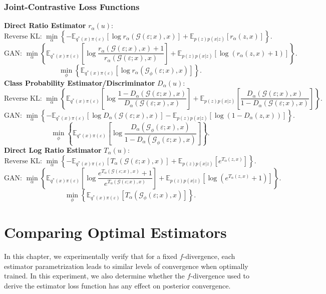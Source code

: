 \documentclass[honours,12pt, twoside]{unswthesis}
\newcommand{\E}{\mathbb{E}}
\numberwithin{equation}{section}
\theoremstyle{definition}
\begin{document}
\subsection{Joint-Contrastive Loss Functions}
\textbf{Direct Ratio Estimator} $r_\alpha(u)$:
\[\text{Reverse KL: }\min_\alpha \left\lbrace-\E_{q^*(x)\pi(\varepsilon)}[\log r_\alpha(\mathcal{G}(\varepsilon;x),x)]+\E_{p(z)p(x|z)}[r_\alpha(z,x)]\right\rbrace.\]
\[\text{GAN: }\min_\alpha \left\lbrace\E_{q^*(x)\pi(\varepsilon)}\left[\log \frac{r_\alpha(\mathcal{G}(\varepsilon;x),x)+1}{r_\alpha(\mathcal{G}(\varepsilon;x),x)}\right]+\E_{p(z)p(x|z)}[\log(r_\alpha(z,x)+1)]\right\rbrace.\]
\[\min_\phi \left\lbrace\E_{q^*(x)\pi(\varepsilon)}\left[\log r_\alpha(\mathcal{G}_\phi(\varepsilon;x),x)\right]\right\rbrace.\]
\textbf{Class Probability Estimator/Discriminator} $D_\alpha(u)$:
\[\text{Reverse KL: }\min_\alpha \left\lbrace\E_{q^*(x)\pi(\varepsilon)}\left[\log \frac{1-D_\alpha(\mathcal{G}(\varepsilon;x),x)}{D_\alpha(\mathcal{G}(\varepsilon;x),x)}\right]+\E_{p(z)p(x|z)}\left[\frac{D_\alpha(\mathcal{G}(\varepsilon;x),x)}{1-D_\alpha(\mathcal{G}(\varepsilon;x),x)}\right]\right\rbrace.\]
\[\text{GAN: }\min_\alpha \left\lbrace-\E_{q^*(x)\pi(\varepsilon)}[\log D_\alpha(\mathcal{G}(\varepsilon;x),x)]-\E_{p(z)p(x|z)}[\log(1-D_\alpha(z,x))]\right\rbrace.\]
\[\min_\phi \left\lbrace\E_{q^*(x)\pi(\varepsilon)}\left[\log \frac{D_\alpha(\mathcal{G}_\phi(\varepsilon;x),x)}{1-D_\alpha(\mathcal{G}_\phi(\varepsilon;x),x)}\right]\right\rbrace.\]
\textbf{Direct Log Ratio Estimator} $T_\alpha(u)$:
\[\text{Reverse KL: }\min_\alpha \left\lbrace-\E_{q^*(x)\pi(\varepsilon)}[T_\alpha(\mathcal{G}(\varepsilon;x),x)]+\E_{p(z)p(x|z)}\left[e^{T_\alpha(z,x)}\right]\right\rbrace.\]
\[\text{GAN: }\min_\alpha \left\lbrace\E_{q^*(x)\pi(\varepsilon)}\left[\log \frac{e^{T_\alpha(\mathcal{G}(\varepsilon;x),x)}+1}{e^{T_\alpha(\mathcal{G}(\varepsilon;x),x)}}\right]+\E_{p(z)p(x|z)}\left[\log\left(e^{T_\alpha(z,x)}+1\right)\right]\right\rbrace.\]
\[\min_\phi \left\lbrace\E_{q^*(x)\pi(\varepsilon)}\left[T_\alpha(\mathcal{G}_\phi(\varepsilon;x),x)\right]\right\rbrace.\]
\chapter{Comparing Optimal Estimators}\label{ch6}
In this chapter, we experimentally verify that for a fixed $f$-divergence, each estimator parametrization leads to similar levels of convergence when optimally trained. In this experiment, we also determine whether the $f$-divergence used to derive the estimator loss function has any effect on posterior convergence.
\end{document}
